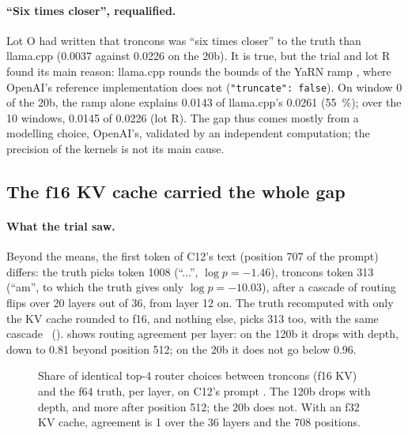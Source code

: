 \paragraph{``Six times closer'', requalified.} Lot O had written that troncons was ``six times closer'' to the truth than llama.cpp (\num{0.0037} against \num{0.0226} on the 20b). It is true, but the trial and lot R found its main reason: llama.cpp rounds the bounds of the YaRN ramp \cite{peng2023yarn}, where OpenAI's reference implementation \cite{openai2025gptossref} does not (\texttt{"truncate": false}). On window 0 of the 20b, the ramp alone explains \num{0.0143} of llama.cpp's \num{0.0261} (\SI{55}{\percent}); over the 10 windows, \num{0.0145} of \num{0.0226} (lot R). The gap thus comes mostly from a modelling choice, OpenAI's, validated by an independent computation; the precision of the kernels is not its main cause.

\subsection{The f16 KV cache carried the whole gap}\label{t2res-sec:kv}

\paragraph{What the trial saw.} Beyond the means, the first token of C12's text (position 707 of the prompt) differs: the truth picks token 1008 (``...'', $\log p = -1.46$), troncons token 313 (``am'', to which the truth gives only $\log p = -10.03$), after a cascade of routing flips over 20 layers out of 36, from layer 12 on. The truth recomputed with only the KV cache rounded to f16, and nothing else, picks 313 too, with the same cascade \mes~().  shows routing agreement per layer: on the 120b it drops with depth, down to \num{0.81} beyond position 512; on the 20b it does not go below \num{0.96}.

\begin{figure}[ht]
\centering
\GrapheResRoutage
\caption[Routing agreement with the truth, per layer]{Share of identical top-4 router choices between troncons (f16 KV) and the f64 truth, per layer, on C12's prompt \mes. The 120b drops with depth, and more after position 512; the 20b does not. With an f32 KV cache, agreement is 1 over the 36 layers and the 708 positions.}
\label{t2res-fig:routage}
\end{figure}

